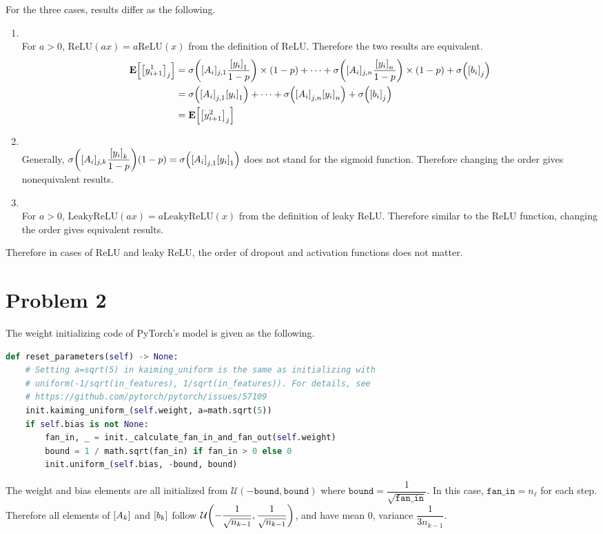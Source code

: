 \documentclass[10pt]{article}
\begin{document}
For the three cases, results differ as the following.
\begin{enumerate}[(1), leftmargin=*]
    \item {} \\
    For $a > 0$, $\mathrm{ReLU}(ax) = a\mathrm{ReLU}(x)$ from the definition of ReLU. Therefore the two results are equivalent.
    \begin{align*}
        \mathbf{E}\qty[\qty[y_{i+1}^1]_j] &= \sigma\qty([A_i]_{j,1}\frac{\qty[y_i]_1}{1-p}) \times (1-p) + \cdots + \sigma\qty([A_i]_{j,n}\frac{\qty[y_i]_n}{1-p}) \times (1-p) + \sigma\qty(\qty[b_i]_j) \\
        &= \sigma\qty(\qty[A_i]_{j,1}\qty[y_i]_1) + \cdots + \sigma\qty(\qty[A_i]_{j,n}\qty[y_i]_n) + \sigma\qty(\qty[b_i]_j) \\
        &= \mathbf{E}\qty[\qty[y_{i+1}^2]_j]
    \end{align*}
    \item {} \\
    Generally, $\sigma\qty([A_i]_{j,k}\dfrac{\qty[y_i]_k}{1-p})(1-p) = \sigma\qty(\qty[A_i]_{j,1}\qty[y_i]_1)$ does not stand for the sigmoid function. 
    Therefore changing the order gives nonequivalent results.
    \item {} \\
    For $a > 0$, $\mathrm{LeakyReLU}(ax) = a\mathrm{LeakyReLU}(x)$ from the definition of leaky ReLU. 
    Therefore similar to the ReLU function, changing the order gives equivalent results.
\end{enumerate}
Therefore in cases of ReLU and leaky ReLU, the order of dropout and activation functions does not matter.

\section*{Problem 2}
The weight initializing code of PyTorch's  model is given as the following.
\begin{lstlisting}[language=Python]
def reset_parameters(self) -> None:
    # Setting a=sqrt(5) in kaiming_uniform is the same as initializing with
    # uniform(-1/sqrt(in_features), 1/sqrt(in_features)). For details, see
    # https://github.com/pytorch/pytorch/issues/57109
    init.kaiming_uniform_(self.weight, a=math.sqrt(5))
    if self.bias is not None:
        fan_in, _ = init._calculate_fan_in_and_fan_out(self.weight)
        bound = 1 / math.sqrt(fan_in) if fan_in > 0 else 0
        init.uniform_(self.bias, -bound, bound)
\end{lstlisting}
The weight and bias elements are all initialized from $\mathcal{U}(-\mathtt{bound}, \mathtt{bound})$  where $\mathtt{bound} = \dfrac{1}{\sqrt{\mathtt{fan\_in}}}$.
In this case, $\mathtt{fan\_in} = n_\ell$ for each step.
Therefore all elements of $\qty[A_k]$ and $\qty[b_k]$ follow $\mathcal{U}\qty(-\dfrac{1}{\sqrt{n_{k-1}}}, \dfrac{1}{\sqrt{n_{k-1}}})$, and have mean 0, variance $\dfrac{1}{3n_{k-1}}$.
\end{document}
